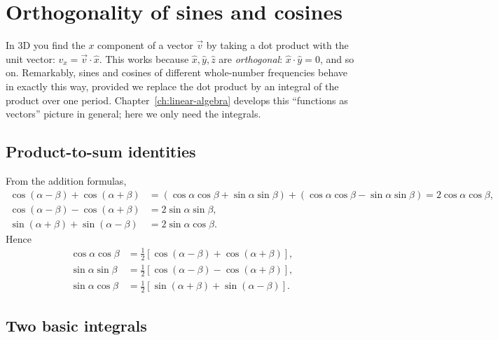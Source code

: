 \section{Orthogonality of sines and cosines}\label{sec:fourier-series-orthogonality}

In 3D you find the $x$ component of a vector $\vec v$ by taking a dot product with the unit vector: $v_x=\vec v\cdot\hat x$. This works because $\hat x,\hat y,\hat z$ are \emph{orthogonal}: $\hat x\cdot\hat y=0$, and so on. Remarkably, sines and cosines of different whole-number frequencies behave in exactly this way, provided we replace the dot product by an integral of the product over one period. Chapter~\ref{ch:linear-algebra} develops this ``functions as vectors'' picture in general; here we only need the integrals.

\subsection{Product-to-sum identities}

From the addition formulas,
\begin{align}
\cos(\alpha-\beta)+\cos(\alpha+\beta)&=(\cos\alpha\cos\beta+\sin\alpha\sin\beta)+(\cos\alpha\cos\beta-\sin\alpha\sin\beta)=2\cos\alpha\cos\beta,\\
\cos(\alpha-\beta)-\cos(\alpha+\beta)&=2\sin\alpha\sin\beta,\\
\sin(\alpha+\beta)+\sin(\alpha-\beta)&=2\sin\alpha\cos\beta .
\end{align}
Hence
\begin{align}
\cos\alpha\cos\beta&=\tfrac12[\cos(\alpha-\beta)+\cos(\alpha+\beta)],\label{eq:fourier-series-pc}\\
\sin\alpha\sin\beta&=\tfrac12[\cos(\alpha-\beta)-\cos(\alpha+\beta)],\label{eq:fourier-series-ps}\\
\sin\alpha\cos\beta&=\tfrac12[\sin(\alpha+\beta)+\sin(\alpha-\beta)].\label{eq:fourier-series-psc}
\end{align}

\subsection{Two basic integrals}

